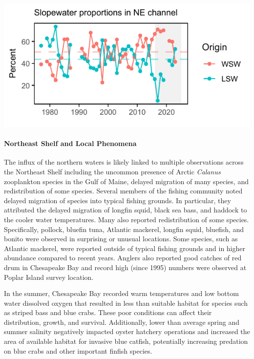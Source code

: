 \documentclass[
  10pt,
]{article}
\let\origfigure\figure
\let\endorigfigure\endfigure
\renewenvironment{figure}[1][2] {
    \expandafter\origfigure\expandafter[H]
} {
    \endorigfigure
}
\begin{document}
\begin{figure}

{\centering \includegraphics{midatlantic_files/figure-latex/slopewater-1} 

}

\caption{The proportion of Warm Slope Water (WSW) and Labrador Slope Water (LSW) enter the Gulf of Maine through the Northeast Channel. The orange and teal dashed lines represent the long-term proportion averages for the WSW and LSW respectively.}\label{fig:slopewater}
\end{figure}

\paragraph{Northeast Shelf and Local Phenomena}\label{northeast-shelf-and-local-phenomena}

The influx of the northern waters is likely linked to multiple observations across the Northeast Shelf including the uncommon presence of Arctic \emph{Calanus} zooplankton species in the Gulf of Maine, delayed migration of many species, and redistribution of some species. Several members of the fishing community noted delayed migration of species into typical fishing grounds. In particular, they attributed the delayed migration of longfin squid, black sea bass, and haddock to the cooler water temperatures. Many also reported redistribution of some species. Specifically, pollock, bluefin tuna, Atlantic mackerel, longfin squid, bluefish, and bonito were observed in surprising or unusual locations. Some species, such as Atlantic mackerel, were reported outside of typical fishing grounds and in higher abundance compared to recent years. Anglers also reported good catches of red drum in Chesapeake Bay and record high (since 1995) numbers were observed at Poplar Island survey location.

In the summer, Chesapeake Bay recorded warm temperatures and low bottom water dissolved oxygen that resulted in less than suitable habitat for species such as striped bass and blue crabs. These poor conditions can affect their distribution, growth, and survival. Additionally, lower than average spring and summer salinity negatively impacted oyster hatchery operations and increased the area of available habitat for invasive blue catfish, potentially increasing predation on blue crabs and other important finfish species.
\end{document}
